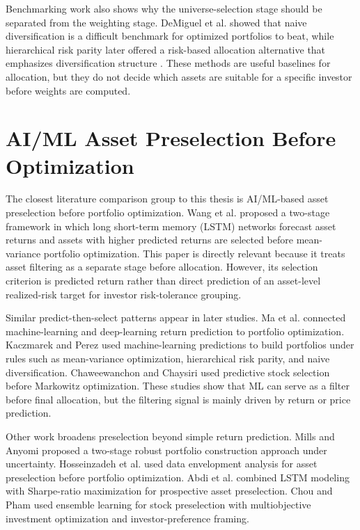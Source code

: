 Benchmarking work also shows why the universe-selection stage should be separated from the weighting stage. DeMiguel et al. \cite{demiguel2009optimal} showed that naive diversification is a difficult benchmark for optimized portfolios to beat, while hierarchical risk parity later offered a risk-based allocation alternative that emphasizes diversification structure \cite{lopezdeprado2016building}. These methods are useful baselines for allocation, but they do not decide which assets are suitable for a specific investor before weights are computed.

\section[AI/ML Asset Preselection Before Optimization]{AI/ML Asset Preselection Before Optimization}

The closest literature comparison group to this thesis is AI/ML-based asset preselection before portfolio optimization. Wang et al. \cite{wang2020portfolioformation} proposed a two-stage framework in which long short-term memory (LSTM) networks forecast asset returns and assets with higher predicted returns are selected before mean-variance portfolio optimization. This paper is directly relevant because it treats asset filtering as a separate stage before allocation. However, its selection criterion is predicted return rather than direct prediction of an asset-level realized-risk target for investor risk-tolerance grouping.

Similar predict-then-select patterns appear in later studies. Ma et al. \cite{ma2021returnprediction} connected machine-learning and deep-learning return prediction to portfolio optimization. Kaczmarek and Perez \cite{kaczmarek2022building} used machine-learning predictions to build portfolios under rules such as mean-variance optimization, hierarchical risk parity, and naive diversification. Chaweewanchon and Chaysiri \cite{chaweewanchon2022} used predictive stock selection before Markowitz optimization. These studies show that ML can serve as a filter before final allocation, but the filtering signal is mainly driven by return or price prediction.

Other work broadens preselection beyond simple return prediction. Mills and Anyomi \cite{mills2022twostage} proposed a two-stage robust portfolio construction approach under uncertainty. Hosseinzadeh et al. \cite{hosseinzadeh2023dea} used data envelopment analysis for asset preselection before portfolio optimization. Abdi et al. \cite{abdi2024prospective} combined LSTM modeling with Sharpe-ratio maximization for prospective asset preselection. Chou and Pham \cite{chou2025ensemble} used ensemble learning for stock preselection with multiobjective investment optimization and investor-preference framing.

